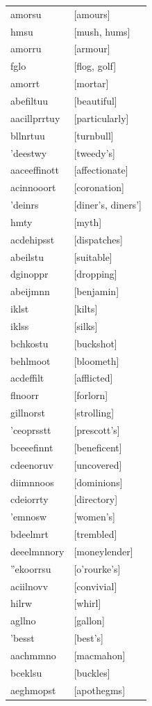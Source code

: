 \documentclass{article}
\begin{document}
\begin{tabular}{ll}
amorsu & [amours] \\
hmsu & [mush, hums] \\
amorru & [armour] \\
fglo & [flog, golf] \\
amorrt & [mortar] \\
abefiltuu & [beautiful] \\
aacillprrtuy & [particularly] \\
bllnrtuu & [turnbull] \\
'deestwy & [tweedy's] \\
aaceeffinott & [affectionate] \\
acinnooort & [coronation] \\
'deinrs & [diner's, diners'] \\
hmty & [myth] \\
acdehipsst & [dispatches] \\
abeilstu & [suitable] \\
dginoppr & [dropping] \\
abeijmnn & [benjamin] \\
iklst & [kilts] \\
iklss & [silks] \\
bchkostu & [buckshot] \\
behlmoot & [bloometh] \\
acdeffilt & [afflicted] \\
flnoorr & [forlorn] \\
gillnorst & [strolling] \\
'ceoprsstt & [prescott's] \\
bceeefinnt & [beneficent] \\
cdeenoruv & [uncovered] \\
diimnnoos & [dominions] \\
cdeiorrty & [directory] \\
'emnosw & [women's] \\
bdeelmrt & [trembled] \\
deeelmnnory & [moneylender] \\
''ekoorrsu & [o'rourke's] \\
aciilnovv & [convivial] \\
hilrw & [whirl] \\
agllno & [gallon] \\
'besst & [best's] \\
aachmmno & [macmahon] \\
bceklsu & [buckles] \\
aeghmopst & [apothegms] \\

\end{tabular}
\end{document}
